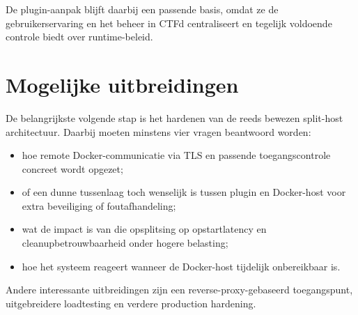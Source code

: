 De plugin-aanpak blijft daarbij een passende basis, omdat ze de gebruikerservaring en het beheer in CTFd centraliseert en tegelijk voldoende controle biedt over runtime-beleid.

\section{Mogelijke uitbreidingen}%
\label{sec:conclusie-uitbreidingen}

De belangrijkste volgende stap is het hardenen van de reeds bewezen split-host architectuur. Daarbij moeten minstens vier vragen beantwoord worden:

\begin{itemize}
  \item hoe remote Docker-communicatie via TLS en passende toegangscontrole concreet wordt opgezet;
  \item of een dunne tussenlaag toch wenselijk is tussen plugin en Docker-host voor extra beveiliging of foutafhandeling;
  \item wat de impact is van die opsplitsing op opstartlatency en cleanupbetrouwbaarheid onder hogere belasting;
  \item hoe het systeem reageert wanneer de Docker-host tijdelijk onbereikbaar is.
\end{itemize}

Andere interessante uitbreidingen zijn een reverse-proxy-gebaseerd toegangspunt, uitgebreidere loadtesting en verdere production hardening.
